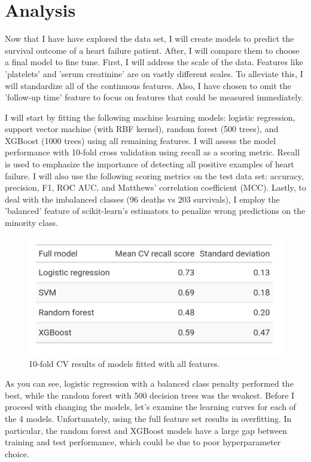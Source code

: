 \documentclass[12pt, letterpaper]{article}
\begin{document}
	
	\section{Analysis}
	Now that I have have explored the data set, I will create models to predict the survival outcome of a heart failure patient. After, I will compare them to choose a final model to fine tune. First, I will address the scale of the data. Features like 'platelets' and 'serum creatinine' are on vastly different scales. To alleviate this, I will standardize all of the continuous features. Also, I have chosen to omit the 'follow-up time' feature to focus on features that could be measured immediately.
	
	I will start by fitting the following machine learning models: logistic regression, support vector machine (with RBF kernel), random forest (500 trees), and XGBoost (1000 trees) using all remaining features. I will assess the model performance with 10-fold cross validation using recall as a scoring metric. Recall is used to emphasize the importance of detecting all positive examples of heart failure. I will also use the following scoring metrics on the test data set: accuracy, precision, F1, ROC AUC, and Matthews' correlation coefficient (MCC). Lastly, to deal with the imbalanced classes (96 deaths vs 203 survivals), I employ the 'balanced' feature of scikit-learn's estimators to penalize wrong predictions on the minority class.
	
	\begin{figure}[H]
		\centering
		\includegraphics[width=0.8\linewidth]{figs/full_model.png}
		\caption{10-fold CV results of models fitted with all features.}
		\label{fig:full_model}
	\end{figure}
	
	As you can see, logistic regression with a balanced class penalty performed the best, while the random forest with 500 decision trees was the weakest. Before I proceed with changing the models, let's examine the learning curves for each of the 4 models. Unfortunately, using the full feature set results in overfitting. In particular, the random forest and XGBoost models have a large gap between training and test performance, which could be due to poor hyperparameter choice.
	
\end{document}
